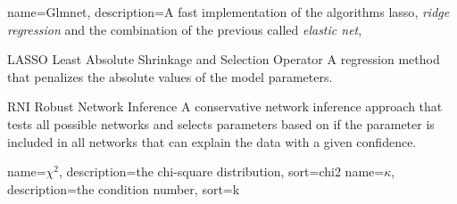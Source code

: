 %
%
\usepackage[toc,acronym,style=long]{glossaries} %
\makeglossaries
\newcommand{\g}{\footnote{For all abbreviations see the glossary on page \pageref{nom}.}} %

\usepackage{xparse} %
 {
}




{
  name=Glmnet,
  description={A fast implementation of the algorithms \gls{lasso}, \emph{ridge regression} and the combination of the previous called \emph{elastic net}},
}

{LASSO}
{Least Absolute Shrinkage and Selection Operator}
{A regression method that penalizes the absolute values of the model parameters.\cite{Tibshirani1996}}

{RNI}
{Robust Network Inference}
{A conservative network inference approach that tests all possible networks and selects parameters based on if the parameter is included in all networks that can explain the data with a given confidence\cite{Nordling2013phdthesis}.}

{
  name={\ensuremath{\chi^2}},
  description={the chi-square distribution},
  sort=chi2
}
{
  name={\ensuremath{\kappa}},
  description={the condition number},
  sort=k
}

